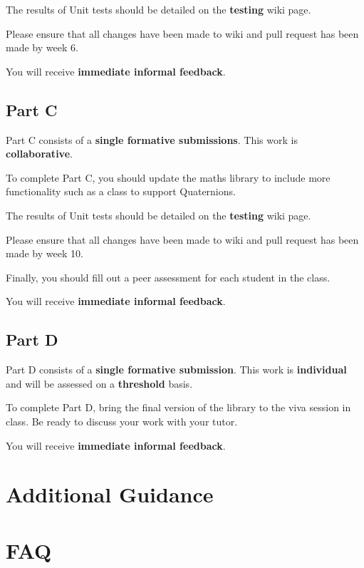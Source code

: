 \documentclass{../../fal_assignment}
\begin{document}
The results of Unit tests should be detailed on the \textbf{testing} wiki page.

Please ensure that all changes have been made to wiki and pull request has been made by week 6. 

You will receive \textbf{immediate informal feedback}.

\subsection*{Part C}

Part C consists of a \textbf{single formative submissions}. This work is \textbf{collaborative}.

To complete Part C, you should update the maths library to include more functionality such as a class to support Quaternions.

The results of Unit tests should be detailed on the \textbf{testing} wiki page.

Please ensure that all changes have been made to wiki and pull request has been made by week 10. 

Finally, you should fill out a peer assessment for each student in the class.

You will receive \textbf{immediate informal feedback}.

\subsection*{Part D}

Part D consists of a \textbf{single formative submission}. This work is \textbf{individual} and will be assessed on a \textbf{threshold} basis.

To complete Part D, bring the final version of the library to the viva session in class.
Be ready to discuss your work with your tutor.

You will receive \textbf{immediate informal feedback}.

\section*{Additional Guidance}


\section*{FAQ}
\end{document}

